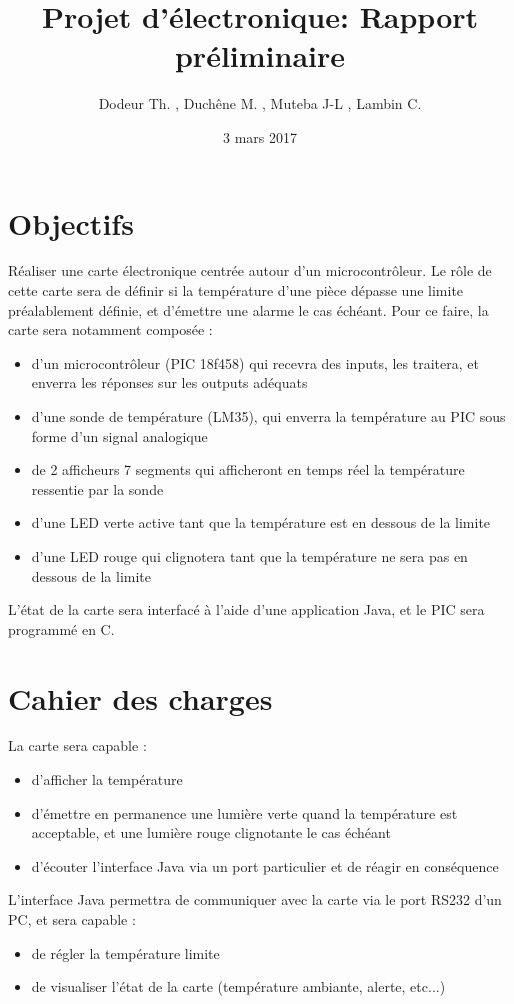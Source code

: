 \documentclass[12pt]{article}
\title{\textbf{Projet d'électronique: Rapport préliminaire}}
\author{Dodeur Th. , Duchêne M. , Muteba J-L , Lambin C.}
\date{3 mars 2017}
\begin{document}
\maketitle

\section{Objectifs}
	Réaliser une carte électronique centrée autour d'un microcontrôleur. Le rôle de cette carte sera de définir si la température d'une pièce
	dépasse une limite préalablement définie, et d'émettre une alarme le cas échéant. Pour ce faire, la carte sera notamment composée :
	\begin{itemize}
		\item d'un microcontrôleur (PIC 18f458) qui recevra des inputs, les traitera, et enverra les réponses sur les outputs adéquats
		\item d'une sonde de température (LM35), qui enverra la température au PIC sous forme d'un signal analogique
		\item de 2 afficheurs 7 segments qui afficheront en temps réel la température ressentie par la sonde
		\item d'une LED verte active tant que la température est en dessous de la limite
		\item d'une LED rouge qui clignotera tant que la température ne sera pas en dessous de la limite
	\end{itemize}
	L'état de la carte sera interfacé à l'aide d'une application Java, et le PIC sera programmé en C.	

\section{Cahier des charges}
	La carte sera capable :
	\begin{itemize}
		\item d'afficher la température
		\item d'émettre en permanence une lumière verte quand la température est acceptable, et une lumière rouge clignotante le cas échéant
		\item d'écouter l'interface Java via un port particulier et de réagir en conséquence
	\end{itemize}	
	L'interface Java permettra de communiquer avec la carte via le port RS232 d'un PC, et sera capable :
	\begin{itemize}
		\item de régler la température limite
		\item de visualiser l'état de la carte (température ambiante, alerte, etc...)
	\end{itemize}
\end{document}
